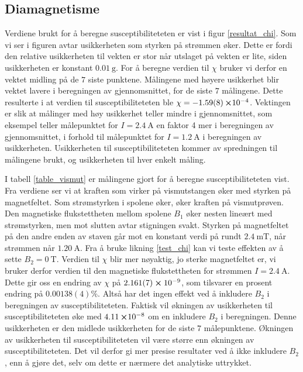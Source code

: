 \documentclass[%
 reprint,
nofootinbib,
aps,
]{revtex4-1}
\begin{document}
\subsection{Diamagnetisme}
Verdiene brukt for å beregne susceptibiliteteten er vist i figur \vref{resultat_chi}. Som vi ser i figuren avtar usikkerheten som styrken på strømmen øker. Dette er fordi den relative usikkerheten til vekten er stor når utslaget på vekten er lite, siden usikkerheten er konstant $\SI{0.01}{\gram}$. For å beregne verdien til $\chi$ bruker vi derfor en vektet midling på de $7$ siste punktene. Målingene med høyere usikkerhet blir vektet lavere i beregningen av gjennomsnittet, for de siste $7$ målingene. Dette resulterte i at verdien til susceptibiliteteten ble $\chi = -\SI{1.59\pm0.08}\cross 10^{-4}$. Vektingen er slik at målinger med høy usikkerhet teller mindre i gjennomsnittet, som eksempel teller målepunktet for $I=\SI{2.4}{\ampere}$ en faktor 4 mer i beregningen av gjennomsnittet, i forhold til målepunktet for $I=\SI{1.2}{\ampere}$ i beregningen av usikkerheten. Usikkerheten til susceptibiliteteten kommer av spredningen til målingene brukt, og usikkerheten til hver enkelt måling.\par
I tabell \vref{table_vismut} er målingene gjort for å beregne susceptibiliteteten vist. Fra verdiene ser vi at kraften som virker på vismutstangen øker med styrken på magnetfeltet. Som strømstyrken i spolene øker, øker kraften på vismutprøven. Den magnetiske flukstettheten mellom spolene $B_1$ øker nesten lineært med strømstyrken, men mot slutten avtar stigningen svakt. Styrken på magnetfeltet på den andre enden av staven går mot en konstant verdi på rundt $\SI{2.4}{\milli\tesla}$, når strømmen når $\SI{1.20}{\ampere}$. Fra å bruke likning \eqref{test_chi} kan vi teste effekten av å sette $B_2=\SI{0}{\tesla}$. Verdien til $\chi$ blir mer nøyaktig, jo sterke magnetfeltet er, vi bruker derfor verdien til den magnetiske flukstettheten for strømmen $I=\SI{2.4}{\ampere}$. Dette gir oss en endring av $\chi$
på $2.161(7)\cross10^{-9}$, som tilsvarer en prosent endring på $0.00138(4)\%$. Altså har det ingen effekt ved å inkludere $B_2$ i beregningen av susceptibiliteteten. Faktisk vil økningen av usikkerheten til susceptibiliteteten øke med $\SI{4.11}\cross 10^{-8}$ om en inkludere $B_2$ i beregningen. Denne usikkerheten er den midlede usikkerheten for de siste $7$ målepunktene. Økningen av usikkerheten til susceptibiliteteten vil være større enn økningen av susceptibiliteteten. Det vil derfor gi mer presise resultater ved å ikke inkludere $B_2$, enn å gjøre det, selv om dette er nærmere det analytiske uttrykket. \\
\end{document}
